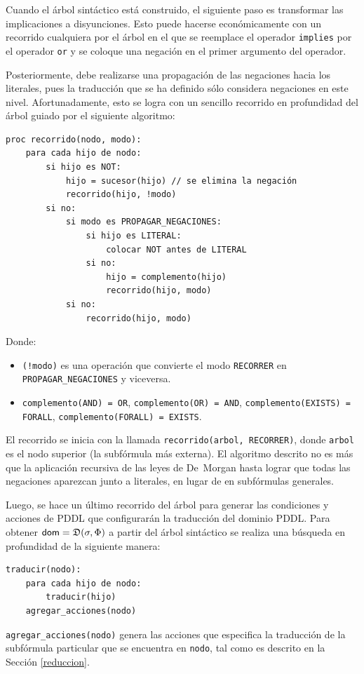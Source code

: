 Cuando el árbol sintáctico está construido, el siguiente paso es transformar
las implicaciones a disyunciones. Esto puede hacerse económicamente con un
recorrido cualquiera por el árbol en el que se reemplace el operador
\texttt{implies} por el operador \texttt{or} y se coloque una negación en el
primer argumento del operador.

Posteriormente, debe realizarse una propagación de las negaciones hacia los
literales, pues la traducción que se ha definido sólo considera negaciones en
este nivel. Afortunadamente, esto se logra con un sencillo recorrido en
profundidad del árbol guiado por el siguiente algoritmo:

\begin{center}
\begin{verbatim}
proc recorrido(nodo, modo):
    para cada hijo de nodo:
        si hijo es NOT:
            hijo = sucesor(hijo) // se elimina la negación
            recorrido(hijo, !modo)
        si no:
            si modo es PROPAGAR_NEGACIONES:
                si hijo es LITERAL:
                    colocar NOT antes de LITERAL
                si no:
                    hijo = complemento(hijo)
                    recorrido(hijo, modo)
            si no:
                recorrido(hijo, modo)
\end{verbatim}
\end{center}
Donde:
\begin{itemize}
\item \texttt{(!modo)} es una operación que convierte el modo
\texttt{RECORRER} en \texttt{PROPAGAR\_NEGACIONES} y viceversa.
\item \texttt{complemento(AND) = OR}, \texttt{complemento(OR) = AND},
\texttt{complemento(EXISTS) = FORALL}, \texttt{complemento(FORALL) = EXISTS}.
\end{itemize}
El recorrido se inicia con la llamada \texttt{recorrido(arbol, RECORRER)},
donde \texttt{arbol} es el nodo superior (la subfórmula más externa).
El algoritmo descrito no es más que la aplicación recursiva de las leyes de De~Morgan
hasta lograr que todas las negaciones aparezcan junto a literales, en lugar de
en subfórmulas generales.

Luego, se hace un último recorrido del árbol para generar las condiciones
y acciones de PDDL que configurarán la traducción del dominio PDDL.
Para obtener $\mathsf{dom}=\mathfrak{D}(\sigma,\Phi)$ a partir del árbol sintáctico se
realiza una búsqueda en profundidad de la siguiente manera:
\begin{center}
\begin{verbatim}
traducir(nodo):
    para cada hijo de nodo:
        traducir(hijo)
    agregar_acciones(nodo)
\end{verbatim}
\end{center}
\texttt{agregar\_acciones(nodo)} genera las acciones que especifica la traducción de la
subfórmula particular que se encuentra en \texttt{nodo}, tal como
es descrito en la Sección \ref{reduccion}.

